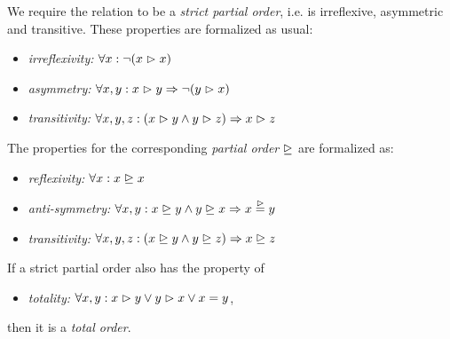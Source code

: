 We require the relation \dominates to be a \emph{strict partial
order}, i.e. \dominates is irreflexive,
asymmetric and transitive. These properties are formalized as usual:

\begin{itemize}
\item \emph{irreflexivity:} 
$\forall x: \neg (x \vartriangleright x)$

\item \emph{asymmetry:} 
$\forall x, y: x \vartriangleright y \Rightarrow \neg (y \vartriangleright x)$

\item \emph{transitivity:} 
$\forall x, y, z: (x \vartriangleright y \land y \vartriangleright z) \Rightarrow x \vartriangleright z$

\end{itemize}

\noindent
The properties for the corresponding \emph{partial order}
$\trianglerighteq$ are formalized as:
\begin{itemize}
\item \emph{reflexivity:} 
$\forall x: x \trianglerighteq x$

\item \emph{anti-symmetry:} 
$\forall x, y: x \trianglerighteq y \land y \trianglerighteq x \Rightarrow x \stackrel{\vartriangleright}{=} y$

\item \emph{transitivity:} 
$\forall x, y, z: (x \trianglerighteq y \land y \trianglerighteq z) \Rightarrow x \trianglerighteq z$
\end{itemize}

\noindent
If a strict partial order also has the property of

\begin{itemize}
\item \emph{totality:} $\forall x, y: x \vartriangleright y \lor y \vartriangleright x \lor x = y$,
\end{itemize}

\noindent
then it is a \emph{total order}.


